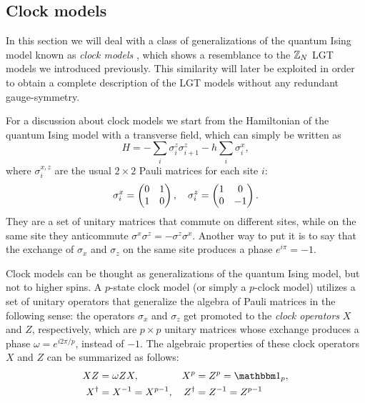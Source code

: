 \subsection{Clock models}%
\label{sub:clock_models}

In this section we will deal with a class of generalizations of the quantum Ising model known as \emph{clock models} \cite{fendley2014parafermions, baxter1989clock}, which shows a resemblance to the $\mathbb{Z}_N$ LGT models we introduced previously.
This similarity will later be exploited in order to obtain a complete description of the LGT models without any redundant gauge-symmetry.

For a discussion about clock models we start from the Hamiltonian of the quantum Ising model with a transverse field, which can simply be written as
\begin{equation}
    H = - \sum_{i} \sigma^z_i \sigma^z_{i+1} - h \sum_{i} \sigma^x_i,
    \label{eq:ising_hamiltonian_duality}
\end{equation}
where $\sigma^{x,z}_i$ are the usual $2 \times 2$ Pauli matrices for each site $i$:
\begin{equation}
    \sigma^x_i = \pmqty{ 0 & 1 \\ 1 &  0 }, \quad
    \sigma^z_i = \pmqty{ 1 & 0 \\ 0 & -1 }.
\end{equation}
They are a set of unitary matrices that commute on different sites, while on the same site they anticommute $\sigma^x \sigma^z = - \sigma^z \sigma^x$.
Another way to put it is to say that the exchange of $\sigma_x$ and $\sigma_z$ on the same site produces a phase $e^{i \pi} = -1$.

Clock models can be thought as generalizations of the quantum Ising model, but not to higher spins.
A $p$-state clock model (or simply a $p$-clock model) utilizes a set of unitary operators that generalize the algebra of Pauli matrices in the following sense:
the operators $\sigma_x$ and $\sigma_z$ get promoted to the \emph{clock operators} $X$ and $Z$, respectively, which are $p \times p$ unitary matrices whose exchange produces a phase $\omega = e^{i 2 \pi / p}$, instead of $-1$.
The algebraic properties of these clock operators $X$ and $Z$ can be summarized as follows:
\begin{equation}
    \begin{aligned}
        X Z & = \omega Z X, &
        X^p & =  Z^p = \One_p, \\
        X^\dagger & = X^{-1} = X^{p-1}, &
        Z^\dagger & = Z^{-1} = Z^{p-1}
    \end{aligned}
    \label{eq:clock_operator_algebra}
\end{equation}


